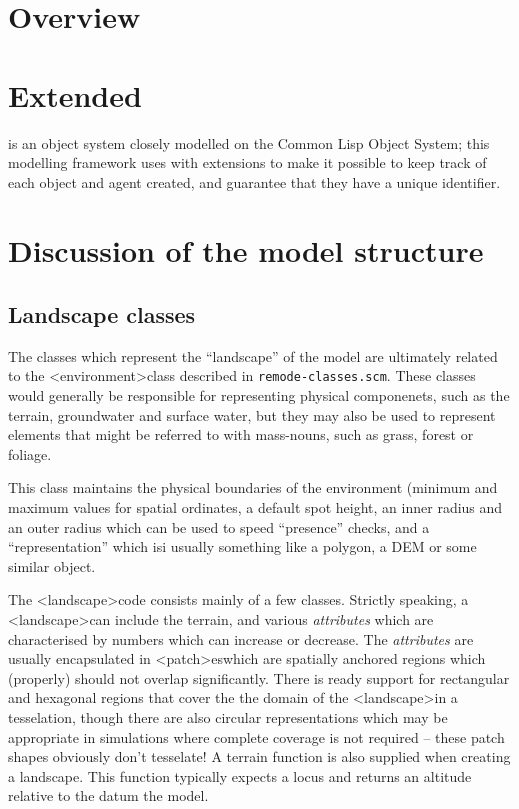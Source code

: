 \documentclass[a4]{article}
\newcommand{\filename}[1]{\texttt{#1}}
\newcommand{\rclass}[1]{\textsf{<#1>}}
\newcommand{\landscape}[0]{\rclass{landscape}}
\newcommand{\environment}[0]{\rclass{environment}}
\newcommand{\patch}[0]{\rclass{patch}}
\newcommand{\patches}[0]{{\patch}es}
\begin{document}
\title[Remodel]{}


\section{Overview}

\section{Extended \SCLOS}

\SCLOS is an object system closely modelled on the Common Lisp Object
System; this modelling framework uses \SCLOS with extensions to
make it possible to keep track of each object and agent created, and
guarantee that they have a unique identifier.  


    


\section{Discussion of the model structure}

\subsection{Landscape classes}
The classes which represent the ``landscape'' of the model are
ultimately related to the \environment class described in
\filename{remode-classes.scm}. These classes would generally be
responsible for representing physical componenets, such as the
terrain, groundwater and surface water, but they may also be used to
represent elements that might be referred to with mass-nouns, such as
grass, forest or foliage.  

This class maintains the physical boundaries of the environment
(minimum and maximum values for spatial ordinates, a default spot
height, an inner radius and an outer radius which can be used to speed
``presence'' checks, and a ``representation'' which isi usually
something like a polygon, a DEM or some similar object.

The \landscape code consists mainly of a few classes.  Strictly
speaking, a \landscape can include the terrain, and various
\textit{attributes} which are characterised by numbers which can
increase or decrease. The \textit{attributes} are usually encapsulated
in \patches which are spatially anchored regions which (properly)
should not overlap significantly.  There is ready support for
rectangular and hexagonal regions that cover the the domain of the
\landscape in a tesselation, though there are also circular
representations which may be appropriate in simulations where complete
coverage is not required -- these patch shapes obviously don't
tesselate!  A terrain function is also supplied when creating a
landscape. This function typically expects a locus and returns an
altitude relative to the datum  the model.
\end{document}
